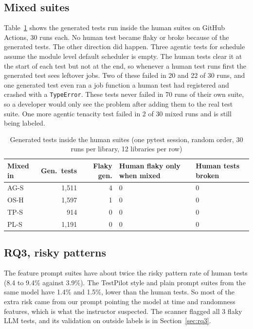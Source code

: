 \documentclass[sigconf,nonacm]{acmart}
\begin{document}
\subsection{Mixed suites}
Table~\ref{tab:mixed} shows the generated tests run inside the human suites on GitHub Actions, 30 runs each. No human test became flaky or broke because of the generated tests. The other direction did happen. Three agentic tests for schedule assume the module level default scheduler is empty. The human tests clear it at the start of each test but not at the end, so whenever a human test runs first the generated test sees leftover jobs. Two of these failed in 20 and 22 of 30 runs, and one generated test even ran a job function a human test had registered and crashed with a \texttt{TypeError}. These tests never failed in 70 runs of their own suite, so a developer would only see the problem after adding them to the real test suite. One more agentic tenacity test failed in 2 of 30 mixed runs and is still being labeled.

\begin{table}[h]
\caption{Generated tests inside the human suites (one pytest session, random order, 30 runs per library, 12 libraries per row)}
\label{tab:mixed}
\small
\begin{tabular}{lrrp{1.6cm}p{1.2cm}}
\toprule
Mixed in & Gen.\ tests & Flaky gen. & Human flaky only when mixed & Human tests broken \\
\midrule
AG-S & 1,511 & 4 & 0 & 0 \\
OS-H & 1,597 & 1 & 0 & 0 \\
TP-S & 914 & 0 & 0 & 0 \\
PL-S & 1,191 & 0 & 0 & 0 \\
\bottomrule
\end{tabular}
\end{table}

\subsection{RQ3, risky patterns}
The feature prompt suites have about twice the risky pattern rate of human tests (8.4 to 9.4\% against 3.9\%). The TestPilot style and plain prompt suites from the same model have 1.4\% and 1.5\%, lower than the human tests. So most of the extra risk came from our prompt pointing the model at time and randomness features, which is what the instructor suspected. The scanner flagged all 3 flaky LLM tests, and its validation on outside labels is in Section~\ref{sec:rq3}.
\end{document}
